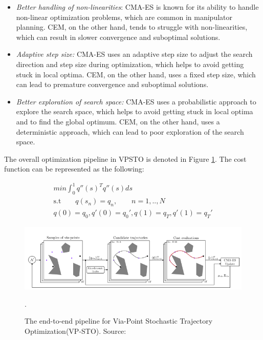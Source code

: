 \begin{itemize}
    \item \textit{Better handling of non-linearities}: CMA-ES is known for its ability to handle non-linear optimization problems, which are common in manipulator planning. CEM, on the other hand, tends to struggle with non-linearities, which can result in slower convergence and suboptimal solutions.
    \item \textit{Adaptive step size:} CMA-ES uses an adaptive step size to adjust the search direction and step size during optimization, which helps to avoid getting stuck in local optima. CEM, on the other hand, uses a fixed step size, which can lead to premature convergence and suboptimal solutions.
    \item \textit{Better exploration of search space:}  CMA-ES uses a probabilistic approach to explore the search space, which helps to avoid getting stuck in local optima and to find the global optimum. CEM, on the other hand, uses a deterministic approach, which can lead to poor exploration of the search space.
\end{itemize}

The overall optimization pipeline in VPSTO is denoted in Figure {\ref{fig:vpsto}}. The cost function can be represented as the following:

\begin{subequations}
\begin{align}
    min \int_{0}^{1}q''(s)^Tq''(s)ds \\
    \text{s.t} \qquad q(s_n) = q_n, \qquad n = 1,..,N \\
    q(0) = q_0, q'(0) = q_0', q(1) = q_T, q'(1) = q_T'
\end{align}
\end{subequations}



\begin{figure}[ht]
    \centering
    \includegraphics[scale=0.5]{figures/bl-manipulator/vpsto.png}
    \caption[The VPSTO pipeline]{The end-to-end pipeline for Via-Point Stochastic Trajectory Optimization(VP-STO). Source: \cite{VPSTO}}.
    \label{fig:vpsto}
\end{figure}


